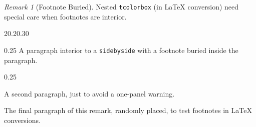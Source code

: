 \documentclass{amsart}
\theoremstyle{plain}%
\theoremstyle{definition}%
\theoremstyle{remark}%
\newtheorem{remark}[theorem]{Remark}
\newcommand{\mono}[1]{\texttt{#1}}
\numberwithin{equation}{section}
\begin{document}
\begin{remark}[Footnote Buried]\label{section-graphics-3-7}%
%
Nested \mono{tcolorbox} (in \LaTeX{} conversion) need special care when footnotes are interior.%
\begin{sidebyside}{2}{0.2}{0.3}{0}%
\begin{sbspanel}{0.25}%
A paragraph interior to a \mono{sidebyside} with a footnote\footnotemark{} buried inside the paragraph.%
\end{sbspanel}%
\begin{sbspanel}{0.25}%
\par
A second paragraph, just to avoid a one-panel warning.%
\end{sbspanel}%
\end{sidebyside}%
\par
The final paragraph of this remark, randomly placed, to test footnotes in \LaTeX{} conversions.%
\end{remark}
%
%
%
\typeout{************************************************}
\typeout{************************************************}
%
\end{document}
